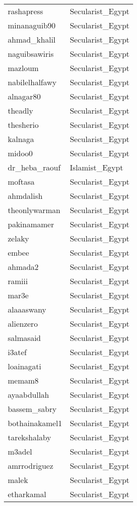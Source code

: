 \begin{longtable}{ll}
  rashapress & Secularist\_Egypt \\ 
  minanaguib90 & Secularist\_Egypt \\ 
  ahmad\_khalil & Secularist\_Egypt \\ 
  naguibsawiris & Secularist\_Egypt \\ 
  mazloum & Secularist\_Egypt \\ 
  nabilelhalfawy & Secularist\_Egypt \\ 
  alnagar80 & Secularist\_Egypt \\ 
  theadly & Secularist\_Egypt \\ 
  thesherio & Secularist\_Egypt \\ 
  kalnaga & Secularist\_Egypt \\ 
  midoo0 & Secularist\_Egypt \\ 
  dr\_heba\_raouf & Islamist\_Egypt \\ 
  moftasa & Secularist\_Egypt \\ 
  ahmdalish & Secularist\_Egypt \\ 
  theonlywarman & Secularist\_Egypt \\ 
  pakinamamer & Secularist\_Egypt \\ 
  zelaky & Secularist\_Egypt \\ 
  embee & Secularist\_Egypt \\ 
  ahmada2 & Secularist\_Egypt \\ 
  ramiii & Secularist\_Egypt \\ 
  mar3e & Secularist\_Egypt \\ 
  alaaaswany & Secularist\_Egypt \\ 
  alienzero & Secularist\_Egypt \\ 
  salmasaid & Secularist\_Egypt \\ 
  i3atef & Secularist\_Egypt \\ 
  loainagati & Secularist\_Egypt \\ 
  memam8 & Secularist\_Egypt \\ 
  ayaabdullah & Secularist\_Egypt \\ 
  bassem\_sabry & Secularist\_Egypt \\ 
  bothainakamel1 & Secularist\_Egypt \\ 
  tarekshalaby & Secularist\_Egypt \\ 
  m3adel & Secularist\_Egypt \\ 
  amrrodriguez & Secularist\_Egypt \\ 
  malek & Secularist\_Egypt \\ 
  etharkamal & Secularist\_Egypt \\ 

\end{longtable}
